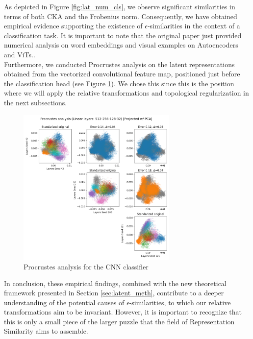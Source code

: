 \documentclass[../main.tex]{subfiles}
\begin{document}
As depicted in Figure \ref{fig:lat_num_cls}, we observe significant similarities in terms of both CKA and the Frobenius norm. Consequently, we have obtained empirical evidence supporting the existence of $\epsilon$-similarities in the context of a classification task. It is important to note that the original paper just provided numerical analysis on word embeddings and visual examples on Autoencoders and ViTs..\\

Furthermore, we conducted Procrustes analysis on the latent representations obtained from the vectorized convolutional feature map, positioned just before the classification head (see Figure \ref{fig:proc_cls}). We chose this since this is the position where we will apply the relative transformations and topological regularization in the next subsections. \\


\begin{figure}[ht!]
    \centering
    \includegraphics[width=0.7\textwidth]{figures/rs/sim_cls/procrustes_512-256-128-32__42_200_121.png} 
    \caption{Procrustes analysis for the CNN classifier}
    \label{fig:proc_cls}
\end{figure}

In conclusion, these empirical findings, combined with the new theoretical framework presented in Section \ref{sec:latent_meth}, contribute to a deeper understanding of the potential causes of $\epsilon$-similarities, to which our relative transformations aim to be invariant. However, it is important to recognize that this is only a small piece of the larger puzzle that the field of Representation Similarity aims to assemble.
\end{document}
